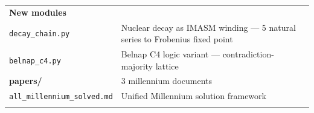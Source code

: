 \begin{longtable}[]{@{}lll@{}}
\begin{minipage}[t]{0.23\columnwidth}
\textbf{New modules}\strut
\end{minipage} & \begin{minipage}[t]{0.26\columnwidth}\raggedright
\strut
\end{minipage} & \begin{minipage}[t]{0.42\columnwidth}\raggedright
\strut
\end{minipage}\tabularnewline
\begin{minipage}[t]{0.23\columnwidth}\raggedright
\texttt{decay\_chain.py}\strut
\end{minipage} & \begin{minipage}[t]{0.26\columnwidth}\raggedright
Nuclear decay as IMASM winding --- 5 natural series to Frobenius fixed
point\strut
\end{minipage} & \begin{minipage}[t]{0.42\columnwidth}\raggedright
\strut
\end{minipage}\tabularnewline
\begin{minipage}[t]{0.23\columnwidth}\raggedright
\texttt{belnap\_c4.py}\strut
\end{minipage} & \begin{minipage}[t]{0.26\columnwidth}\raggedright
Belnap C4 logic variant --- contradiction-majority lattice\strut
\end{minipage} & \begin{minipage}[t]{0.42\columnwidth}\raggedright
\strut
\end{minipage}\tabularnewline
\begin{minipage}[t]{0.23\columnwidth}\raggedright
\textbf{papers/}\strut
\end{minipage} & \begin{minipage}[t]{0.26\columnwidth}\raggedright
3 millennium documents\strut
\end{minipage} & \begin{minipage}[t]{0.42\columnwidth}\raggedright
\strut
\end{minipage}\tabularnewline
\begin{minipage}[t]{0.23\columnwidth}\raggedright
\texttt{all\_millennium\_solved.md}\strut
\end{minipage} & \begin{minipage}[t]{0.26\columnwidth}\raggedright
Unified Millennium solution framework\strut
\end{minipage} & \begin{minipage}[t]{0.42\columnwidth}\raggedright
\strut
\end{minipage}\tabularnewline
\begin{minipage}[t]{0.23\columnwidth}\raggedright

\end{minipage}
\end{longtable}
